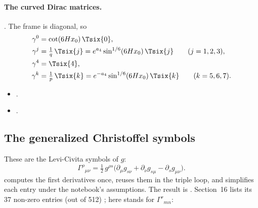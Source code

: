 \paragraph{The curved Dirac matrices.} .
The frame is diagonal, so \cfderived
\begin{equation}
\begin{aligned}
  \gamma^0&=\cot(6Hx_0)\,\Tsix{0},\\
  \gamma^j&=\tfrac1q\,\Tsix{j}=e^{a_4}\sin^{1/6}(6Hx_0)\,\Tsix{j}\qquad(j=1,2,3),\\
  \gamma^4&=\Tsix{4},\\
  \gamma^k&=\tfrac1p\,\Tsix{k}=e^{-a_4}\sin^{1/6}(6Hx_0)\,\Tsix{k}\qquad(k=5,6,7).
\end{aligned}
\end{equation}
\begin{itemize}
  \item {} .
  \item {} .
\end{itemize}

\subsection{The generalized Christoffel symbols}
\label{csc:christoffel}\label{sec:6.4}

These are the Levi-Civita symbols of $g$:
\begin{equation}
  \Gamma^\rho{}_{\mu\nu}=\tfrac12\,g^{\rho s}\bigl(\partial_\mu g_{s\nu}+\partial_\nu g_{s\mu}-\partial_s g_{\mu\nu}\bigr).
\end{equation}
 computes the first derivatives
 once, reuses them in the triple loop, and simplifies
each entry under the notebook's assumptions. The result is .
Section~16 lists its 37 non-zero entries (out of 512) ; here
 stands for $\Gamma^r{}_{mn}$:

